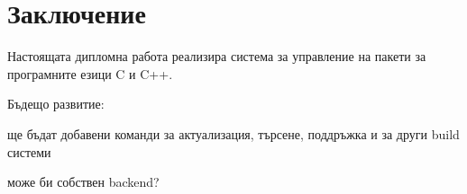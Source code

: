 \chapter*{Заключение}

Настоящата дипломна работа реализира система за управление на пакети за
програмните езици C и C++.

Бъдещо развитие:

ще бъдат добавени команди за актуализация, търсене, поддръжка и за други
build системи

може би собствен backend?
